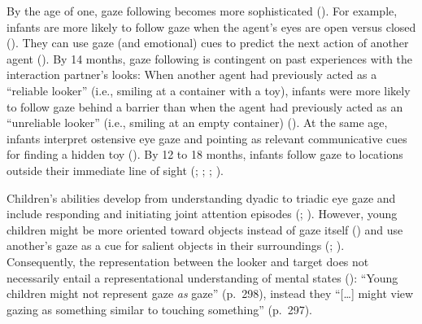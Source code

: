 \documentclass[
]{scrbook}
\begin{document}
By the age of one, gaze following becomes more sophisticated (). For example, infants are more likely to follow gaze when the agent's eyes are open versus closed (). They can use gaze (and emotional) cues to predict the next action of another agent (). By 14 months, gaze following is contingent on past experiences with the interaction partner's looks: When another agent had previously acted as a ``reliable looker'' (i.e., smiling at a container with a toy), infants were more likely to follow gaze behind a barrier than when the agent had previously acted as an ``unreliable looker'' (i.e., smiling at an empty container) (). At the same age, infants interpret ostensive eye gaze and pointing as relevant communicative cues for finding a hidden toy (). By 12 to 18 months, infants follow gaze to locations outside their immediate line of sight (; ; ; ).

Children's abilities develop from understanding dyadic to triadic eye gaze and include responding and initiating joint attention episodes (; ). However, young children might be more oriented toward objects instead of gaze itself () and use another's gaze as a cue for salient objects in their surroundings (; ). Consequently, the representation between the looker and target does not necessarily entail a representational understanding of mental states (): ``Young children might not represent gaze \emph{as} gaze'' (p.~298), instead they ``{[}\ldots{]} might view gazing as something similar to touching something'' (p.~297).
\end{document}
